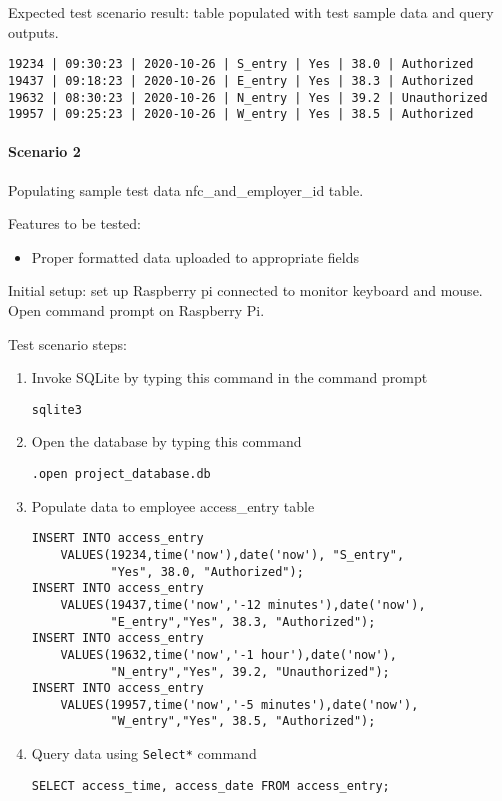 \noindent
Expected test scenario result: table populated with test sample data and query
outputs.

\begin{lstlisting}
19234 | 09:30:23 | 2020-10-26 | S_entry | Yes | 38.0 | Authorized
19437 | 09:18:23 | 2020-10-26 | E_entry | Yes | 38.3 | Authorized
19632 | 08:30:23 | 2020-10-26 | N_entry | Yes | 39.2 | Unauthorized
19957 | 09:25:23 | 2020-10-26 | W_entry | Yes | 38.5 | Authorized
\end{lstlisting}

\paragraph{Scenario 2}
Populating sample test data nfc\_and\_employer\_id table.

\noindent
Features to be tested:
\begin{itemize}
    \item Proper formatted data uploaded to appropriate fields
\end{itemize}

\noindent
Initial setup: set up Raspberry pi connected to monitor keyboard and mouse.
Open command prompt on Raspberry Pi.

\noindent
Test scenario steps:
\begin{enumerate}
    \item Invoke SQLite by typing this command in the command prompt
\begin{listing}[H]
\begin{verbatim}
sqlite3
\end{verbatim}
\end{listing}
    \item Open the database by typing this command
\begin{listing}[H]
\begin{verbatim}
.open project_database.db
\end{verbatim}
\end{listing}
    \item Populate data to employee access\_entry table
\begin{listing}[H]
\begin{verbatim}
INSERT INTO access_entry
    VALUES(19234,time('now'),date('now'), "S_entry",
           "Yes", 38.0, "Authorized");
INSERT INTO access_entry
    VALUES(19437,time('now','-12 minutes'),date('now'),
           "E_entry","Yes", 38.3, "Authorized");
INSERT INTO access_entry
    VALUES(19632,time('now','-1 hour'),date('now'),
           "N_entry","Yes", 39.2, "Unauthorized");
INSERT INTO access_entry
    VALUES(19957,time('now','-5 minutes'),date('now'),
           "W_entry","Yes", 38.5, "Authorized");
\end{verbatim}
\end{listing}
    \item Query data using \lstinline{Select*} command
\begin{listing}[H]
\begin{verbatim}
SELECT access_time, access_date FROM access_entry;
\end{verbatim}
\end{listing}
\end{enumerate}

